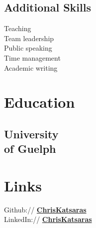\documentclass[letterpaper]{deedy-resume} %
\begin{document}
\begin{minipage}[t]{0.25\textwidth}
\sectionspace %

\subsection{Additional Skills}
\sectionspace %
\textbullet{} Teaching\\ 
\textbullet{} Team leadership\\
\textbullet{} Public speaking\\ 
\textbullet{} Time management\\
\textbullet{} Academic writing\\
\sectionspace %

\section{Education} 

\subsection[University]{University\\ of Guelph}


\sectionspace %


\sectionspace %


\section{Links} 

Github:// \href{https://github.com/ChrisKatsaras}{\bf ChrisKatsaras} \\
LinkedIn:// \href{https://www.linkedin.com/in/christopher-katsaras-0a326211a?trk=hp-identity-photo}{\bf ChrisKatsaras} \\
\sectionspace %



\end{minipage} %
\end{document}
